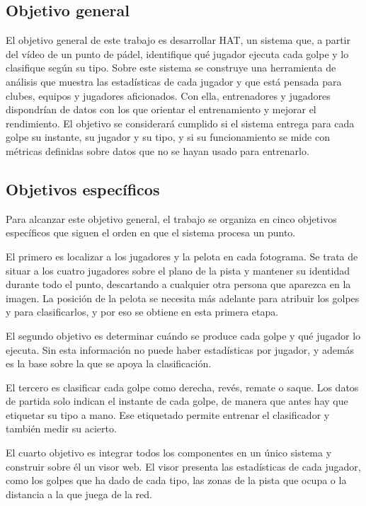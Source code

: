 \subsection{Objetivo general}
\label{sec:objetivo-general}

El objetivo general de este trabajo es desarrollar HAT, un sistema que, a partir del vídeo de un punto de pádel, identifique qué jugador ejecuta cada golpe y lo clasifique según su tipo.
Sobre este sistema se construye una herramienta de análisis que muestra las estadísticas de cada jugador y que está pensada para clubes, equipos y jugadores aficionados.
Con ella, entrenadores y jugadores dispondrían de datos con los que orientar el entrenamiento y mejorar el rendimiento.
El objetivo se considerará cumplido si el sistema entrega para cada golpe su instante, su jugador y su tipo, y si su funcionamiento se mide con métricas definidas sobre datos que no se hayan usado para entrenarlo.

\subsection{Objetivos específicos}
\label{sec:objetivos-especificos}

Para alcanzar este objetivo general, el trabajo se organiza en cinco objetivos específicos que siguen el orden en que el sistema procesa un punto.

El primero es localizar a los jugadores y la pelota en cada fotograma.
Se trata de situar a los cuatro jugadores sobre el plano de la pista y mantener su identidad durante todo el punto, descartando a cualquier otra persona que aparezca en la imagen.
La posición de la pelota se necesita más adelante para atribuir los golpes y para clasificarlos, y por eso se obtiene en esta primera etapa.

El segundo objetivo es determinar cuándo se produce cada golpe y qué jugador lo ejecuta.
Sin esta información no puede haber estadísticas por jugador, y además es la base sobre la que se apoya la clasificación.

El tercero es clasificar cada golpe como derecha, revés, remate o saque.
Los datos de partida solo indican el instante de cada golpe, de manera que antes hay que etiquetar su tipo a mano.
Ese etiquetado permite entrenar el clasificador y también medir su acierto.

El cuarto objetivo es integrar todos los componentes en un único sistema y construir sobre él un visor web.
El visor presenta las estadísticas de cada jugador, como los golpes que ha dado de cada tipo, las zonas de la pista que ocupa o la distancia a la que juega de la red.

